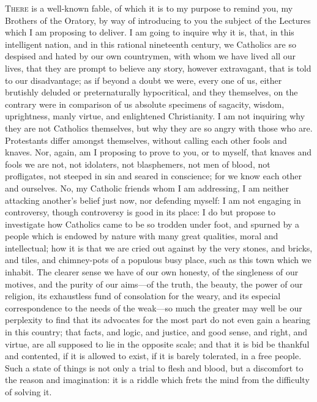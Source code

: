 T\textsc{here} is a well-known fable, of which it is to my
purpose to remind you, my Brothers of the Oratory, by way
of introducing to you the subject of the Lectures which I
am proposing to deliver. I am going to inquire why it is,
that, in this intelligent nation, and in this rational
nineteenth century, we Catholics are so despised and
hated by our own countrymen, with whom we have lived all
our lives, that they are prompt to believe any story,
however extravagant, that is told to our disadvantage; as
if beyond a doubt we were, every one of us, either
brutishly deluded or preternaturally hypocritical, and
they themselves, on the contrary were in comparison of us
absolute specimens of sagacity, wisdom, uprightness,
manly virtue, and enlightened Christianity. I am not
inquiring why they are not Catholics themselves, but why
they are so angry with those who are. Protestants differ
amongst themselves, without calling each other fools and
knaves. Nor, again, am I proposing to prove to you, or to
myself, that knaves and fools we are not, not idolaters,
not blasphemers, not men of blood, not profligates, not
steeped in sin and seared in conscience; for we know each
other and ourselves. No, my Catholic friends whom I am
addressing, I am neither attacking another's belief just
now, nor defending myself: I am not engaging in
controversy, though controversy is good in its place: I
do but propose to investigate how Catholics came to be so
trodden under foot, and spurned by a people which is
endowed by nature with many great qualities, moral and
intellectual; how it is that we are cried out against by
the very stones, and bricks, and tiles, and chimney-pots
of a populous busy place, such as this town which we
inhabit. The clearer sense we have of our own honesty, of
the singleness of our motives, and the purity of our
aims—of the truth, the beauty, the power of our
religion, its exhaustless fund of consolation for the
weary, and its especial correspondence to the needs of
the weak—so much the greater may well be our
perplexity to find that its advocates for the most part
do not even gain a hearing in this country; that facts,
and logic, and justice, and good sense, and right, and
virtue, are all supposed to lie in the opposite scale;
and that it is bid be thankful and contented, if it is
allowed to exist, if it is barely tolerated, in a free
people. Such a state of things is not only a trial to
flesh and blood, but a discomfort to the reason and
imagination: it is a riddle which frets the mind from the
difficulty of solving it.

